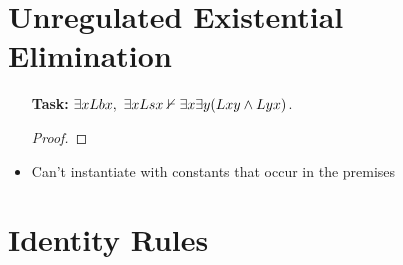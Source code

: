 \documentclass[a4paper, 11pt]{article} %
\begin{document}
\section*{Unregulated Existential Elimination}%
  \label{sec:Unregulated}
  
\begin{itemize}
  \item[\bf Task:] $\exists x Lbx,\ \exists x Lsx \nvdash \exists x\exists y(Lxy \wedge Lyx)$.
    \begin{proof}
            \pr{}
            \pr{}
        \open
                
            \open
                    
                     
                
                
            \close
            
        \close
        
    \end{proof}
  \item Can't instantiate with constants that occur in the premises
\end{itemize}




\section*{Identity Rules}
\end{document}
